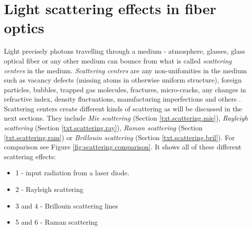 




\section{Light scattering effects in fiber optics}\label{txt.scattering}

Light precisely photons travelling through a medium - atmosphere, glasses, glass optical fiber or any other medium can bounce from what is called \textit{scattering centers} in the medium. \textit{Scattering centers} are any non-unifomities in the medium such as vacancy defects (missing atoms in otherwise uniform structure), foreign particles, bubbles, trapped gas molecules, fractures, micro-cracks, any changes in refractive index, density fluctuations, manufacturing imperfections and others \cite{scatteringcenterbook}. Scattering centers create different kinds of scattering as will be discussed in the next sections. They include \textit{Mie scattering} (Section \ref{txt.scattering.mie}), \textit{Rayleigh scattering} (Section \ref{txt.scattering.ray}), \textit{Raman scattering} (Section \ref{txt.scattering.ram}) or \textit{Brillouin scattering} (Section \ref{txt.scattering.bril}). For comparison see Figure \ref{fig:scattering.comparison}. It shows all of these different scattering effects:

\begin{itemize}
    \item 1 - input radiation from a laser diode.
    \item 2 - Rayleigh scattering 
    \item 3 and 4 - Brillouin scattering lines %
    \item 5 and 6 - Raman scattering 
\end{itemize}


